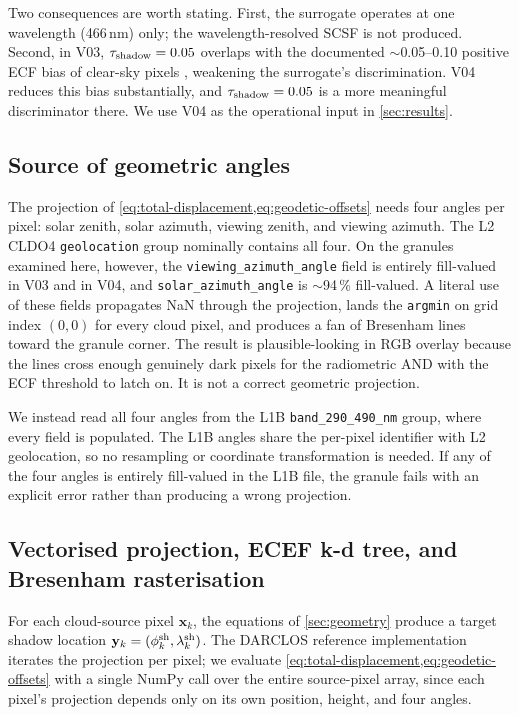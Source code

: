 \documentclass[11pt,a4paper]{article}
\newcommand{\code}[1]{\texttt{#1}}
\begin{document}
Two consequences are worth stating. First, the surrogate operates at
one wavelength (466\,nm) only; the wavelength-resolved SCSF is not
produced. Second, in V03, $\tau_{\rm shadow} = 0.05$ overlaps with the
documented $\sim$0.05--0.10 positive ECF bias of clear-sky pixels
\citep{wang2025cldo4}, weakening the surrogate's discrimination. V04
reduces this bias substantially, and $\tau_{\rm shadow} = 0.05$ is a
more meaningful discriminator there. We use V04 as the operational
input in \cref{sec:results}.

\subsection{Source of geometric angles}\label{sec:angles}

The projection of \cref{eq:total-displacement,eq:geodetic-offsets} needs
four angles per pixel: solar zenith, solar azimuth, viewing zenith, and
viewing azimuth. The L2 CLDO4 \code{geolocation} group nominally
contains all four. On the granules examined here, however, the
\code{viewing\_azimuth\_angle} field is entirely fill-valued in V03 and
in V04, and \code{solar\_azimuth\_angle} is $\sim$94\,\% fill-valued. A
literal use of these fields propagates NaN through the projection, lands
the \code{argmin} on grid index $(0,0)$ for every cloud pixel, and
produces a fan of Bresenham lines toward the granule corner. The result
is plausible-looking in RGB overlay because the lines cross enough
genuinely dark pixels for the radiometric AND with the ECF threshold to
latch on. It is not a correct geometric projection.

We instead read all four angles from the L1B \code{band\_290\_490\_nm}
group, where every field is populated. The L1B angles share the
per-pixel identifier with L2 geolocation, so no resampling or coordinate
transformation is needed. If any of the four angles is entirely
fill-valued in the L1B file, the granule fails with an explicit error
rather than producing a wrong projection.

\subsection{Vectorised projection, ECEF k-d tree, and Bresenham
rasterisation}\label{sec:projection}

For each cloud-source pixel $\mathbf{x}_k$, the equations of
\cref{sec:geometry} produce a target shadow location
$\mathbf{y}_k = (\phi_k^{\rm sh}, \lambda_k^{\rm sh})$. The DARCLOS
reference implementation iterates the projection per pixel; we evaluate
\cref{eq:total-displacement,eq:geodetic-offsets} with a single NumPy
call over the entire source-pixel array, since each pixel's projection
depends only on its own position, height, and four angles.
\end{document}
